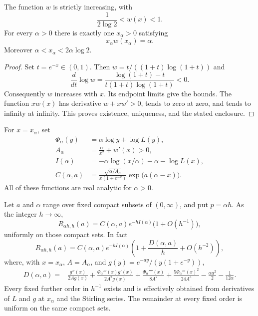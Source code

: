 \begin{lemma}\label{saddle:lem:w}
The function $w$ is strictly increasing, with
\[
 \frac1{2\log2}<w(x)<1.
\]
For every $\alpha>0$ there is exactly one $x_\alpha>0$ satisfying
\begin{equation}\label{saddle:eq:saddle-equation}
 x_\alpha w(x_\alpha)=\alpha.
\end{equation}
Moreover $\alpha<x_\alpha<2\alpha\log2$.
\end{lemma}
\begin{proof}
Set $t=e^{-x}\in(0,1)$. Then
$w=t/((1+t)\log(1+t))$ and
\[
 \frac{d}{dt}\log w
 =\frac{\log(1+t)-t}{t(1+t)\log(1+t)}<0.
\]
Consequently $w$ increases with $x$. Its endpoint limits give the bounds.
The function $xw(x)$ has derivative $w+xw'>0$, tends to zero at zero,
and tends to infinity at infinity. This proves existence, uniqueness,
and the stated enclosure.
\end{proof}

For $x=x_\alpha$, set
\begin{align}
 \Phi_\alpha(y)&=\alpha\log y+\log L(y),\label{saddle:eq:phase}\\
 A_\alpha&=\frac{\alpha}{x^2}+w'(x)>0,\label{saddle:eq:A}\\
 I(\alpha)&=-\alpha\log(x/\alpha)-\alpha-\log L(x),\label{saddle:eq:rate}\\
 C(\alpha,a)&=
 \frac{\sqrt{\alpha/A_\alpha}}{x(1+e^{-x})}
 \exp\bigl(a(\alpha-x)\bigr).\label{saddle:eq:C}
\end{align}
All of these functions are real analytic for $\alpha>0$.

\begin{theorem}\label{saddle:thm:saddle}
Let $a$ and $\alpha$ range over fixed compact subsets of $(0,\infty)$,
and put $p=\alpha h$. As the integer $h\to\infty$,
\begin{equation}\label{saddle:eq:saddle-leading}
 R_{\alpha h,h}(a)
 =C(\alpha,a)e^{-hI(\alpha)}\bigl(1+O(h^{-1})\bigr),
\end{equation}
uniformly on those compact sets. In fact
\begin{equation}\label{saddle:eq:saddle-second}
 R_{\alpha h,h}(a)
 =C(\alpha,a)e^{-hI(\alpha)}
 \left(1+\frac{D(\alpha,a)}h+O(h^{-2})\right),
\end{equation}
where, with $x=x_\alpha$, $A=A_\alpha$, and
$g(y)=e^{-ay}/(y(1+e^{-y}))$,
\begin{align}
 D(\alpha,a)={}&
 \frac{g''(x)}{2Ag(x)}
 +\frac{\Phi_\alpha'''(x)g'(x)}{2A^2g(x)}
 +\frac{\Phi_\alpha''''(x)}{8A^2}
 +\frac{5\Phi_\alpha'''(x)^2}{24A^3}
 -\frac{\alpha a^2}{2}-\frac1{12\alpha}.
 \label{saddle:eq:D}
\end{align}
Every fixed further order in $h^{-1}$ exists and is effectively obtained
from derivatives of $L$ and $g$ at $x_\alpha$ and the Stirling series.
The remainder at every fixed order is uniform on the same compact sets.
\end{theorem}

